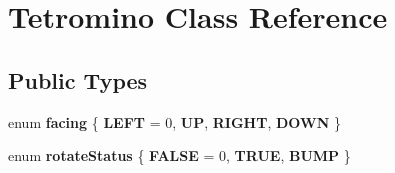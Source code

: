 \hypertarget{class_tetromino}{\section{Tetromino Class Reference}
\label{class_tetromino}
}
\subsection*{Public Types}
\begin{DoxyCompactItemize}
\item 
enum {\bfseries facing} \{ {\bfseries L\-E\-F\-T} = 0, 
{\bfseries U\-P}, 
{\bfseries R\-I\-G\-H\-T}, 
{\bfseries D\-O\-W\-N}
 \}
\item 
enum {\bfseries rotate\-Status} \{ {\bfseries F\-A\-L\-S\-E} = 0, 
{\bfseries T\-R\-U\-E}, 
{\bfseries B\-U\-M\-P}
 \}
\end{DoxyCompactItemize}
